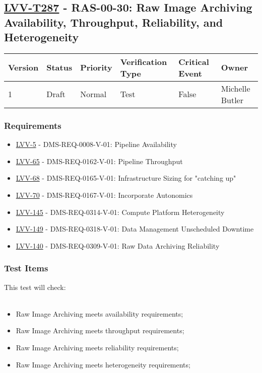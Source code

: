 \subsection{\href{https://jira.lsstcorp.org/secure/Tests.jspa\#/testCase/LVV-T287}{LVV-T287}
    - RAS-00-30: Raw Image Archiving Availability, Throughput, Reliability, and Heterogeneity}\label{lvv-t287}

\begin{longtable}[]{llllll}
\toprule
Version & Status & Priority & Verification Type & Critical Event & Owner
\\\midrule
1 & Draft & Normal &
Test & False & Michelle Butler
\\\bottomrule
\end{longtable}

\subsubsection{Requirements}
\begin{itemize}
\item \href{https://jira.lsstcorp.org/browse/LVV-5}{LVV-5} - DMS-REQ-0008-V-01: Pipeline Availability
\item \href{https://jira.lsstcorp.org/browse/LVV-65}{LVV-65} - DMS-REQ-0162-V-01: Pipeline Throughput
\item \href{https://jira.lsstcorp.org/browse/LVV-68}{LVV-68} - DMS-REQ-0165-V-01: Infrastructure Sizing for "catching up"
\item \href{https://jira.lsstcorp.org/browse/LVV-70}{LVV-70} - DMS-REQ-0167-V-01: Incorporate Autonomics
\item \href{https://jira.lsstcorp.org/browse/LVV-145}{LVV-145} - DMS-REQ-0314-V-01: Compute Platform Heterogeneity
\item \href{https://jira.lsstcorp.org/browse/LVV-149}{LVV-149} - DMS-REQ-0318-V-01: Data Management Unscheduled Downtime
\item \href{https://jira.lsstcorp.org/browse/LVV-140}{LVV-140} - DMS-REQ-0309-V-01: Raw Data Archiving Reliability
\end{itemize}

\subsubsection{Test Items}
This test will check:\\
~\\

\begin{itemize}
\tightlist
\item
  Raw Image Archiving meets availability requirements;
\item
  Raw Image Archiving meets throughput requirements;
\item
  Raw Image Archiving meets reliability requirements;
\item
  Raw Image Archiving meets heterogeneity requirements;
\end{itemize}

